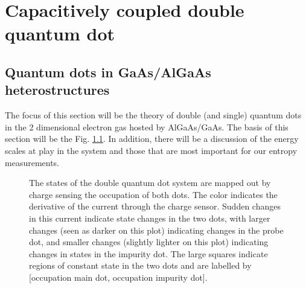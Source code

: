 
\chapter{Capacitively coupled double quantum dot}
\label{ch:Methods}
\section{Quantum dots in GaAs/AlGaAs heterostructures}
\label{sec:qds}

The focus of this section will be the theory of double (and single) quantum dots in the 2 dimensional electron gas hosted by AlGaAs/GaAs. The basis of this section will be the Fig. \ref{fig:dqd}. In addition, there will be a discussion of the energy scales at play in the system and those that are most important for our entropy measurements.

\begin{figure}[h]
\centering
{}
\caption{The states of the double quantum dot system are mapped out by charge sensing the occupation of both dots. The color indicates the derivative of the current through the charge sensor. Sudden changes in this current indicate state changes in the two dots, with larger changes (seen as darker on this plot) indicating changes in the probe dot, and smaller changes (slightly lighter on this plot) indicating changes in states in the impurity dot. The large squares indicate regions of constant state in the two dots and are labelled by [occupation main dot, occupation impurity dot].}
\label{fig:dqd}       %
\end{figure}

